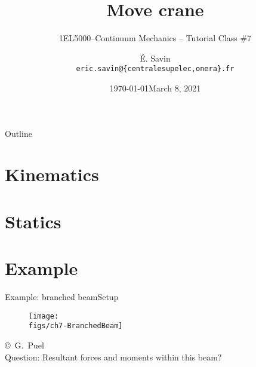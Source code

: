 \documentclass{beamer}
\title[1EL5000/S7]
{Move crane}
\subtitle{1EL5000--Continuum Mechanics -- Tutorial Class \#7} %
\author[\'E. Savin] %
{\'E. Savin\inst{1,2}\\ \scriptsize{\texttt{eric.savin@\{centralesupelec,onera\}.fr}}}%
\institute[Onera] %
{\inst{1}{Information Processing and Systems Dept.\\\Onera, France}
\and
 \inst{2}{Mechanical and Civil Engineering Dept.\\\ECP, France}}%
\date{\today}
\date{March 8, 2021}
\begin{document}
\begin{frame}
  \titlepage
\end{frame}

\begin{frame}{Outline}
  \tableofcontents
\end{frame}




\section{Kinematics}


\section{Statics}


\section{Example}

\begin{frame}{Example: branched beam}{Setup}

\begin{figure}
\centering\texttt{[image: \\figs/ch7-BranchedBeam]}
\end{figure}
\vskip-25pt{\hspace{7truecm}\mbox{\tiny{\copyright\ G. Puel}}}\\
\vskip20pt
Question: Resultant forces and moments within this beam?

\end{frame}
\end{document}
